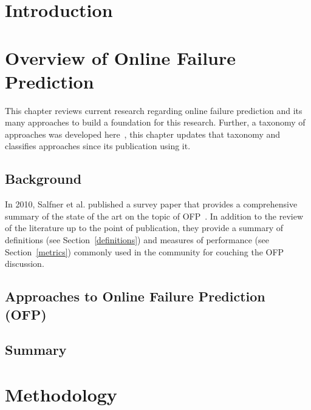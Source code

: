 \documentclass[12pt,letterpaper,oneside]{book}
\begin{document}
\frontmatter
	\flyleaf                        
	\disclaimerpage                 
	\titlepageAFIT                      
	\committeepage  
	
	
	\tableofcontents
	\listoffigures
	\listoftables
\mainmatter

\chapter{Introduction}


\chapter{Overview of Online Failure Prediction} \label{chapter2}
This chapter reviews current research regarding online failure prediction and
its many approaches to build a foundation for this research.  Further, a
taxonomy of approaches was developed here~\cite{salfnerSurvey}, this chapter
updates that taxonomy and classifies approaches since its publication using it.

\section{Background} \label{background}
In 2010, Salfner et al. published a survey paper that provides a comprehensive
summary of the state of the art on the topic of OFP~\cite{salfnerSurvey}.  In
addition to the review of the literature up to the point of publication, they
provide a summary of definitions (see Section~\ref{definitions}) and measures
of performance (see Section~\ref{metrics}) commonly used in the community for
couching the OFP discussion.




\section{Approaches to Online Failure Prediction (OFP)} \label{approaches}





\section{Summary} \label{litReviewSummary}


\chapter{Methodology}

\end{document}
